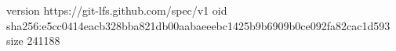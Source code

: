 version https://git-lfs.github.com/spec/v1
oid sha256:e5cc0414eacb328bba821db00aabaeeebc1425b9b6909b0ce092fa82cac1d593
size 241188
